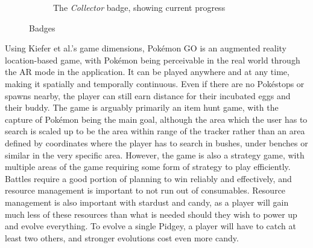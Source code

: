 \begin{figure}[h]
\begin{subfigure}[t]{0.3\textwidth}
		\caption{The \emph{Collector} badge, showing current progress}
		\label{fig:pogo-badges}
	\end{subfigure}
	\caption{Badges}
\end{figure}

Using Kiefer et al.'s \cite{kiefer2006systematically} game dimensions, Pokémon GO is an augmented reality location-based game, with Pokémon being perceivable in the real world through the AR mode in the application. It can be played anywhere and at any time, making it spatially and temporally continuous. Even if there are no Pokéstops or spawns nearby, the player can still earn distance for their incubated eggs and their buddy. The game is arguably primarily an item hunt game, with the capture of Pokémon being the main goal, although the area which the user has to search is scaled up to be the area within range of the tracker rather than an area defined by coordinates where the player has to search in bushes, under benches or similar in the very specific area. However, the game is also a strategy game, with multiple areas of the game requiring some form of strategy to play efficiently. Battles require a good portion of planning to win reliably and effectively, and resource management is important to not run out of consumables. Resource management is also important with stardust and candy, as a player will gain much less of these resources than what is needed should they wish to power up and evolve everything. To evolve a single Pidgey, a player will have to catch at least two others, and stronger evolutions cost even more candy.
